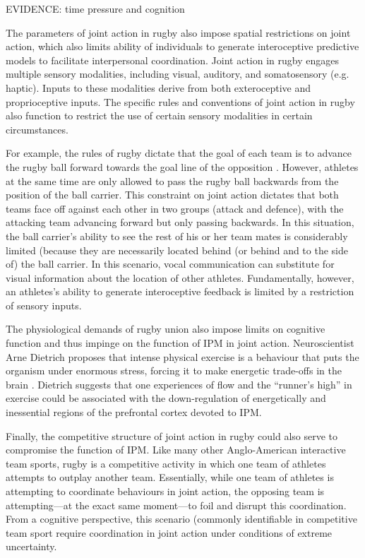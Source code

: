 \begin{CJK}{UTF8}{gbsn}
  EVIDENCE: time pressure and cognition

  The parameters of joint action in rugby also impose spatial restrictions on joint action, which also limits ability of individuals to generate interoceptive predictive models to facilitate interpersonal coordination. Joint action in rugby engages multiple sensory modalities, including visual, auditory, and somatosensory (e.g. haptic).  Inputs to these modalities derive from both exteroceptive and proprioceptive inputs.  The specific rules and conventions of joint action in rugby also function to restrict the use of certain sensory modalities in certain circumstances.

  For example, the rules of rugby dictate that the goal of each team is to advance the rugby ball forward towards the goal line of the opposition \citep{IRB2014}. However, athletes at the same time are only allowed to pass the rugby ball backwards from the position of the ball carrier.  This constraint on joint action dictates that both teams face off against each other in two groups (attack and defence), with the attacking team advancing forward but only passing backwards.  In this situation, the ball carrier's ability to see the rest of his or her team mates is considerably limited (because they are necessarily located behind (or behind and to the side of) the ball carrier.  In this scenario, vocal communication can substitute for visual information about the location of other athletes.  Fundamentally, however, an athletes's ability to generate interoceptive feedback is limited by a restriction of sensory inputs.

  The physiological demands of rugby union also impose limits on cognitive function and thus impinge on the function of IPM in joint action.  Neuroscientist Arne Dietrich proposes that intense physical exercise is a behaviour that puts the organism under enormous stress, forcing it to make energetic trade-offs in the brain \citep{Dietrich2004b,Dietrich2011}.  Dietrich suggests that one experiences of flow and the ``runner's high'' in exercise could be associated with the down-regulation of energetically and inessential regions of the prefrontal cortex devoted to IPM.

  Finally, the competitive structure of joint action in rugby could also serve to compromise the function of IPM.  Like many other Anglo-American interactive team sports, rugby is a competitive activity in which one team of athletes attempts to outplay another team.  Essentially, while one team of athletes is attempting to coordinate behaviours in joint action, the opposing team is attempting---at the exact same moment---to foil and disrupt this coordination.  From a cognitive perspective, this scenario  (commonly identifiable in competitive team sport require coordination in joint action under conditions of extreme uncertainty.



\end{CJK}
